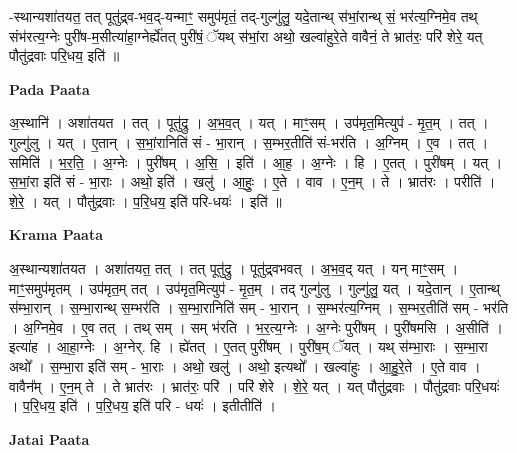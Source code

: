 \documentclass[17pt]{extarticle}
\begin{document}
-स्थान्यशा॑तयत॒ तत् पूतु॑द्र्व-भव॒द्-यन्माꣳ॒॒ समुप॑मृतं॒ तद्-गुल्गु॑लु॒ यदे॒तान्थ् स॑भां॒रान्थ् सं॒ भर॑त्य॒ग्निमे॒व तथ् संभ॑रत्य॒ग्नेः पुरी॑ष-म॒सीत्या॑हा॒ग्नेर्ह्ये॑तत् पुरी॑षं॒ ॅयथ् स॑भां॒रा अथो॒ खल्वा॑हुरे॒ते वावैनं॒ ते भ्रात॑रः॒ परि॑ शेरे॒ यत् पौतु॑द्रवाः परि॒धय॒ इति॑ ॥ \newline

\textbf{Pada Paata} \newline

अ॒स्थानि॑ । अशा॑तयत । तत् । पूतु॑द्रु । अ॒भ॒व॒त् । यत् । माꣳ॒॒सम् । उप॑मृत॒मित्युप॑ - मृ॒त॒म् । तत् । गुल्गु॑लु । यत् । ए॒तान् । स॒भां॒रानिति॑ सं - भा॒रान् । स॒म्भर॒तीति॑ सं-भर॑ति । अ॒ग्निम् । ए॒व । तत् । समिति॑ । भ॒र॒ति॒ । अ॒ग्नेः । पुरी॑षम् । अ॒सि॒ । इति॑ । आ॒ह॒ । अ॒ग्नेः । हि । ए॒तत् । पुरी॑षम् । यत् । स॒भां॒रा इति॑ सं - भा॒राः । अथो॒ इति॑ । खलु॑ । आ॒हुः॒ । ए॒ते । वाव । ए॒न॒म् । ते । भ्रात॑रः । परीति॑ । शे॒रे॒ । यत् । पौतु॑द्रवाः । प॒रि॒धय॒ इति॑ परि-धयः॑ । इति॑ ॥  \newline


\textbf{Krama Paata} \newline

अ॒स्थान्यशा॑तयत । अशा॑तयत॒ तत् । तत् पूतु॑द्रु । पूतु॑द्र्वभवत् । अ॒भ॒व॒द् यत् । यन् माꣳ॒॒सम् । माꣳ॒॒समुप॑मृतम् । उप॑मृत॒म् तत् । उप॑मृत॒मित्युप॑ - मृ॒त॒म् । तद् गुल्गु॑लु । गुल्गु॑लु॒ यत् । यदे॒तान् । ए॒तान्थ् 
स॑म्भा॒रान् । स॒म्भा॒रान्थ् स॒म्भर॑ति । स॒म्भा॒रानिति॑ सम् - भा॒रान् । स॒म्भर॑त्य॒ग्निम् । स॒म्भर॒तीति॑ सम् - भर॑ति । अ॒ग्निमे॒व । ए॒व तत् । तथ् सम् । सम् भ॑रति । भ॒र॒त्य॒ग्नेः । अ॒ग्नेः पुरी॑षम् । पुरी॑षमसि । अ॒सीति॑ । इत्या॑ह । आ॒हा॒ग्नेः । अ॒ग्नेर्. हि । ह्ये॑तत् । ए॒तत् पुरी॑षम् । पुरी॑ष॒म् ॅयत् । यथ् स॑म्भा॒राः । स॒म्भा॒रा अथो᳚ । स॒म्भा॒रा इति॑ सम् - भा॒राः । अथो॒ खलु॑ । अथो॒ इत्यथो᳚ । खल्वा॑हुः । आ॒हु॒रे॒ते । ए॒ते वाव । वावैन᳚म् । ए॒न॒म् ते । ते भ्रात॑रः । भ्रात॑रः॒ परि॑ । परि॑ शेरे । शे॒रे॒ यत् । यत् पौतु॑द्रवाः । पौतु॑द्रवाः परि॒धयः॑ । प॒रि॒धय॒ इति॑ । प॒रि॒धय॒ इति॑ परि - धयः॑ । इतीतीति॑ । \newline

\textbf{Jatai Paata} \newline
\end{document}
